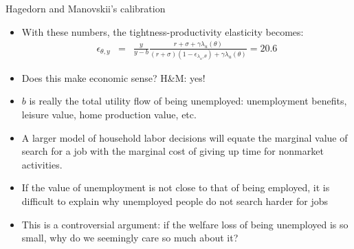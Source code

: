 \documentclass[9pt]{beamer}
\newcommand{\bit}{\begin{itemize}}
\newcommand{\eit}{\end{itemize}}
\begin{document}
\begin{frame}{Hagedorn and Manovskii's calibration}

\bit
\setlength\itemsep{1.5em}

\item With these numbers, the tightness-productivity elasticity becomes:
\begin{eqnarray}
\epsilon_{\theta, y} &=& \frac{y}{y-b} \frac{r+ \sigma + \gamma \lambda_u(\theta)}{(r + \sigma)(1-\epsilon_{\lambda_u,\theta}) + \gamma \lambda_u(\theta)} = 20.6 \nonumber
\end{eqnarray}

\item Does this make economic sense? H\&M: yes!

\item $b$ is really the total utility flow of being unemployed: unemployment benefits, leisure value, home production value, etc.

\item A larger model of household labor decisions will equate the marginal value of search for a job with the marginal cost of giving up time for nonmarket activities.

\item If the value of unemployment is not close to that of being employed, it is difficult to explain why unemployed people do not search harder for jobs

\item This is a controversial argument: if the welfare loss of being unemployed is so small, why do we seemingly care so much about it?

\eit
\end{frame}
\end{document}
